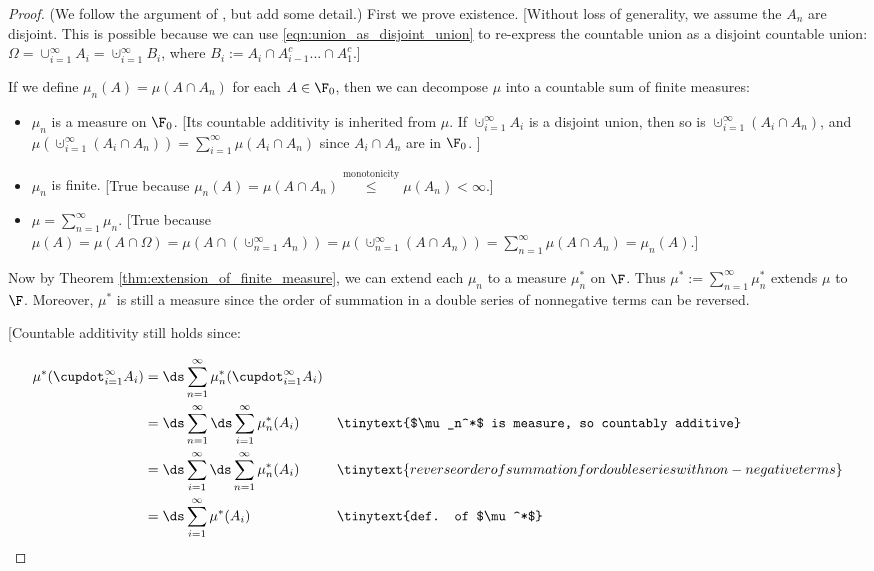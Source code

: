 \documentclass{article} %
\begin{document}
\begin{proof} (We follow the argument of \cite{ash2000probability}, but add some detail.) 
First we prove existence.  {\footnotesize [Without loss of generality, we assume the $A_n$ are disjoint.  This is possible because we can use \eqref{eqn:union_as_disjoint_union} to re-express the countable union as a disjoint countable union:  $\Omega = \cup_{i=1}^\infty A_i = \cupdot_{i=1}^\infty B_i$, where $B_i := A_i \cap A_{i-1}^c ... \cap A_1^c$.]  } 

If we define $\mu_n(A)=\mu(A \cap A_n)$ for each $A \in \F_0$, then we can decompose $\mu$ into a countable sum of finite measures:
\begin{itemize}
\item $\mu_n$ is a measure on $\F_0$. {\footnotesize   [Its countable additivity is inherited from $\mu$. If $\cupdot_{i=1}^\infty A_i$ is a disjoint union, then so is $\cupdot_{i=1}^\infty (A_i \cap A_n)$, and $\mu( \cupdot_{i=1}^\infty (A_i \cap A_n)) = \sum_{i=1}^\infty \mu(A_i \cap A_n) $ since $A_i \cap A_n$ are in $\F_0$. ] }
\item $\mu_n$ is finite.  {\footnotesize  [True because $\mu_n(A) = \mu(A \cap A_n) \stackrel{\text{monotonicity}}{\leq} \mu(A_n) < \infty$.]	 }
\item  $\mu = \sum_{n=1}^\infty \mu_n$. {\footnotesize  [True because $\mu(A) = \mu(A \cap \Omega) = \mu(A \cap (\cupdot_{n=1}^\infty A_n)) =\mu(\cupdot_{n=1}^\infty (A \cap A_n)) = \sum_{n=1}^\infty \mu(A \cap A_n) = \mu_n (A). $] }
\end{itemize}
Now by Theorem \ref{thm:extension_of_finite_measure}, we can extend each $\mu_n$ to a measure $\mu_n^*$ on $\F$.   Thus $\mu^* := \sum_{n=1}^\infty \mu_n^*$ extends $\mu$ to $\F$.  Moreover, $\mu^*$ is still a measure since the order of summation in a double series of nonnegative terms can be reversed.  {\footnotesize   [Countable additivity still holds  since:

\begin{align*}
\mu^*(\cupdot_{i=1}^\infty A_i) &= \ds\sum_{n=1}^\infty \mu_n^* (\cupdot_{i=1}^\infty A_i) && \\ &= \ds\sum_{n=1}^\infty \ds\sum_{i=1}^\infty \mu_n^* (A_i) && \tinytext{$\mu_n^*$ is measure, so countably additive}\\
	&= \ds\sum_{i=1}^\infty \ds\sum_{n=1}^\infty \mu_n^*(A_i) && \tinytext{reverse order of summation for double series with non-negative terms} \\
	&= \ds\sum_{i=1}^\infty \mu^*(A_i) && \tinytext{def. of $\mu^*$}
\end{align*}

}
\end{proof}
\end{document}
